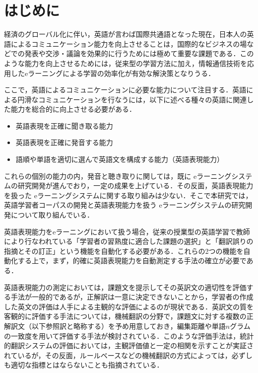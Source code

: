 \documentclass[japanese]{jnlp_1.4}
\begin{document}
\maketitle



\section{はじめに}
経済のグローバル化に伴い，英語が言わば国際共通語となった現在，日本人の英語によるコミュニケーション能力を向上させることは，国際的なビジネスの場などでの発表や交渉・議論を効果的に行うためには極めて重要な課題である．このような能力を向上させるためには，従来型の学習方法に加え，情報通信技術を応用したeラーニングによる学習の効率化が有効な解決策となりうる．

ここで，英語によるコミュニケーションに必要な能力について注目する．英語による円滑なコミュニケーションを行なうには，以下に述べる種々の英語に関連した能力を総合的に向上させる必要がある．
\begin{itemize}
\item 英語表現を正確に聞き取る能力
\item 英語表現を正確に発音する能力
\item 語順や単語を適切に選んで英語文を構成する能力（英語表現能力）
\end{itemize}
これらの個別の能力の内，発音と聴き取りに関しては，既に eラーニングシステムの研究開発が進んでおり，一定の成果を上げている\cite{hirose_2001,yamada_ica_2004}．その反面，英語表現能力を扱った eラーニングシステムに関する取り組みは少ない．そこで本研究では，英語学習者コーパスの開発と英語表現能力を扱う eラーニングシステムの研究開発について取り組んでいる．


英語表現能力をeラーニングにおいて扱う場合，従来の授業型の英語学習で教師により行なわれている「学習者の習熟度に適合した課題の選択」と「翻訳誤りの指摘とその訂正」という機能を自動化する必要がある．これらの2つの機能を自動化する上で，まず，的確に英語表現能力を自動測定する手法の確立が必要である．


英語表現能力の測定においては，課題文を提示してその英訳文の適切性を評価する手法が一般的であるが，正解訳は一意に決定できないことから，学習者の作成した英文の評価は人手による主観的な評価によるのが現状である．英訳文の質を客観的に評価する手法については，機械翻訳の分野で，課題文に対する複数の正解訳文（以下参照訳と略称する）を予め用意しておき，編集距離や単語$n$グラムの一致度を用いて評価する手法が検討されている．このような評価手法は，統計的翻訳システムの評価においては，主観評価値と一定の相関を示すことが実証されているが\cite{papineni-EtAl:2002:ACL}，その反面，ルールベースなどの機械翻訳の方式によっては，必ずしも適切な指標とはならないことも指摘されている\cite{burch_eacl_2006}．
\end{document}
